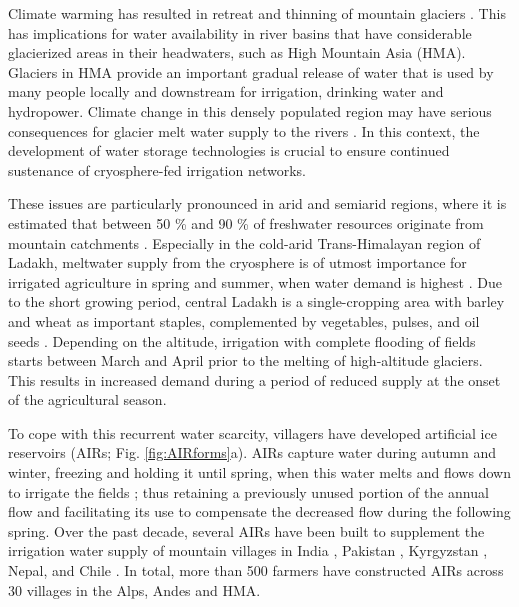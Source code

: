 \documentclass[tc, manuscript]{copernicus}
\begin{document}

\introduction

Climate warming has resulted in retreat and thinning of mountain glaciers
\citep{ipccCrossChapterPaperMountains2022}. This has implications for water availability in river basins that
have considerable glacierized areas in their headwaters, such as High Mountain Asia (HMA). Glaciers in HMA
provide an important gradual release of water that is used by many people locally and downstream for irrigation,
drinking water and hydropower. Climate change in this densely populated region may have serious consequences for
glacier melt water supply to the rivers \citep{immerzeelImportanceVulnerabilityWorld2020}. In this context, the
development of water storage technologies is crucial to ensure continued sustenance of cryosphere-fed irrigation
networks.

These issues are particularly pronounced in arid and semiarid regions, where it is estimated that between 50 \%
and 90 \% of freshwater resources originate from mountain catchments
\citep{mukhopadhyayReevaluationSnowmeltGlacial2015}. Especially in the cold-arid Trans-Himalayan region of
Ladakh, meltwater supply from the cryosphere is of utmost importance for irrigated agriculture in spring and
summer, when water demand is highest \citep{nusserCryosphereFedIrrigationNetworks2019}. Due to the short growing
period, central Ladakh is a single-cropping area with barley and wheat as important staples, complemented by
vegetables, pulses, and oil seeds \citep{nusserSociohydrologyArtificialGlaciers2019}. Depending on the altitude,
irrigation with complete flooding of fields starts between March and April prior to the melting of high-altitude
glaciers. This results in increased demand during a period of reduced supply at the onset of the agricultural
season.

To cope with this recurrent water scarcity, villagers have developed artificial ice reservoirs (AIRs; Fig.
\ref{fig:AIRforms}a). AIRs capture water during autumn and winter, freezing and holding it until spring, when
this water melts and flows down to irrigate the fields \citep{ipccChapterHighMountain2019, vinceGlacierMan2009,
clouseLadakhArtificialGlaciers2017, nusserSociohydrologyArtificialGlaciers2019}; thus retaining a previously
unused portion of the annual flow and facilitating its use to compensate the decreased flow during the following
spring. Over the past decade, several AIRs have been built to supplement the irrigation water supply of mountain
villages in India \citep{wangchukIceStupaCompetition2020, palmerStoringFrozenWater2022,
aggarwalAdaptationClimateChange2021}, Pakistan \citep{awazproductionIceStupaArtificial2022}, Kyrgyzstan
\citep{bbcnewsBrightArtificialGlacier2020}, Nepal, and Chile \citep{reutersConservationistsChileAim2021}. In
total, more than 500 farmers have constructed AIRs across 30 villages in the Alps, Andes and HMA.
\end{document}
